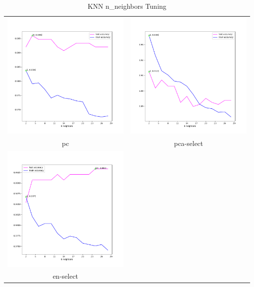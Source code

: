 \documentclass{article}
\begin{document}
\begin{table}[H]
\begin{tabular}{cc}
       \includegraphics[width = .45\textwidth]{images/knn-tune-pc.png} & \includegraphics[width = .45\textwidth]{images/knn-tune-pcavar.png}\\
      pc& pca-select\\
       
       \includegraphics[width = .45\textwidth]{images/knn-tune-en.png} \\
       en-select & \\
    \end{tabular}
    \caption{KNN n\_neighbors Tuning}
    \label{knn-tuning-picture}
\end{table}
\end{document}

